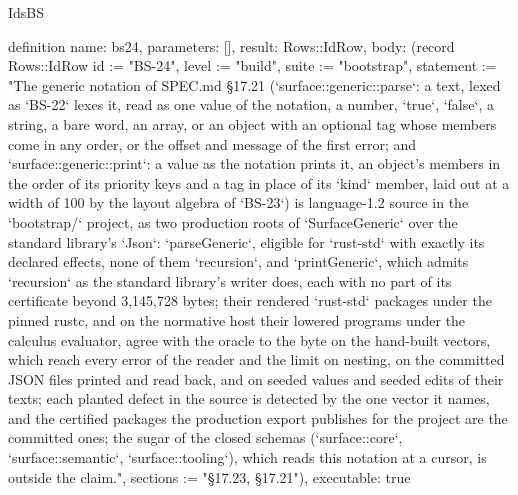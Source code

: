 \begin{lexlean}{IdsBS}
\begin{semanticmodule}
definition{
  name: bs24,
  parameters: [],
  result: Rows::IdRow,
  body: (record Rows::IdRow {id := "BS-24", level := "build", suite := "bootstrap", statement := "The generic notation of SPEC.md §17.21 (`surface::generic::parse`: a text, lexed as `BS-22` lexes it, read as one value of the notation, a number, `true`, `false`, a string, a bare word, an array, or an object with an optional tag whose members come in any order, or the offset and message of the first error; and `surface::generic::print`: a value as the notation prints it, an object's members in the order of its priority keys and a tag in place of its `kind` member, laid out at a width of 100 by the layout algebra of `BS-23`) is language-1.2 source in the `bootstrap/` project, as two production roots of `SurfaceGeneric` over the standard library's `Json`: `parseGeneric`, eligible for `rust-std` with exactly its declared effects, none of them `recursion`, and `printGeneric`, which admits `recursion` as the standard library's writer does, each with no part of its certificate beyond 3,145,728 bytes; their rendered `rust-std` packages under the pinned rustc, and on the normative host their lowered programs under the calculus evaluator, agree with the oracle to the byte on the hand-built vectors, which reach every error of the reader and the limit on nesting, on the committed JSON files printed and read back, and on seeded values and seeded edits of their texts; each planted defect in the source is detected by the one vector it names, and the certified packages the production export publishes for the project are the committed ones; the sugar of the closed schemas (`surface::core`, `surface::semantic`, `surface::tooling`), which reads this notation at a cursor, is outside the claim.", sections := "§17.23, §17.21"}),
  executable: true
}


\end{semanticmodule}
\end{lexlean}

